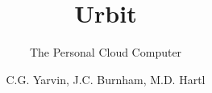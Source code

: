 \documentclass[14pt]{extbook} %
\title{Urbit}
\subtitle{The Personal Cloud Computer}
\author{C.G. Yarvin, J.C. Burnham, M.D. Hartl}
\date{}
\begin{document}

\frontmatter
\maketitle
\tableofcontents
\
\mainmatter







\end{document}
